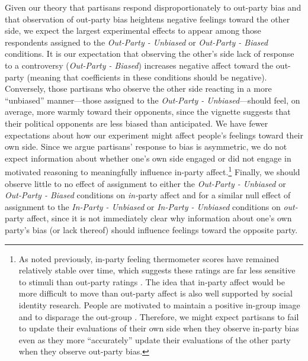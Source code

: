 \documentclass[12pt, letterpaper]{article}
\begin{document}
Given our theory that partisans respond disproportionately to out-party bias and that observation of out-party bias heightens negative feelings toward the other side, we expect the largest experimental effects to appear among those respondents assigned to the \textit{Out-Party - Unbiased} or \textit{Out-Party - Biased} conditions. It is our expectation that observing the other's side lack of response to a controversy (\textit{Out-Party - Biased}) increases negative affect toward the out-party (meaning that coefficients in these conditions should be negative). Conversely, those partisans who observe the other side reacting in a more ``unbiased'' manner---those assigned to the \textit{Out-Party - Unbiased}---should feel, on average, more warmly toward their opponents, since the vignette suggests that their political opponents are less biased than anticipated. We have fewer expectations about how our experiment might affect people's feelings toward their own side. Since we argue partisans' response to bias is asymmetric, we do not expect information about whether one's own side engaged or did not engage in motivated reasoning to meaningfully influence in-party affect.\footnote{As noted previously, in-party feeling thermometer scores have remained relatively stable over time, which suggests these ratings are far less sensitive to stimuli than out-party ratings \citep{haidthetherington_2012, IyengarSoodLelkes2012}. The idea that in-party affect would be more difficult to move than out-party affect is also well supported by social identity research. People are motivated to maintain a positive in-group image and to disparage the out-group \citep{tajfelturner_1979}. Therefore, we might expect partisans to fail to update their evaluations of their own side when they observe in-party bias even as they more ``accurately'' update their evaluations of the other party when they observe out-party bias.} Finally, we should observe little to no effect of assignment to either the \textit{Out-Party - Unbiased} or \textit{Out-Party - Biased} conditions on \textit{in-}party affect and for a similar null effect of assignment to the \textit{In-Party - Unbiased} or \textit{In-Party - Unbiased} conditions on \textit{out-}party affect, since it is not immediately clear why information about one's own party's bias (or lack thereof) should influence feelings toward the opposite party. 
\end{document}

